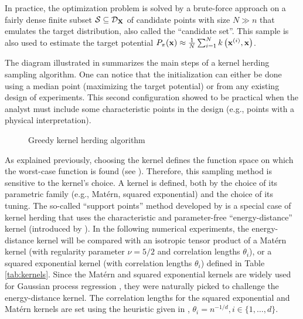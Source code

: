\begin{remark}
In practice, the optimization problem is solved by a brute-force approach on a fairly dense finite subset $\mathcal{S}\subseteq\mathcal{D}_{{\bf X}}$ of candidate points with size $N \gg n$ that emulates the target distribution, also called the ``candidate set''. 
This sample is also used to estimate the target potential $P_\pi({\bf x}) \approx \frac1N \sum_{i=1}^N k\left({\bf x}^{(i)}, {\bf x}\right)$.
\end{remark}
\medskip

The diagram illustrated in  summarizes the main steps of a kernel herding sampling algorithm. 
One can notice that the initialization can either be done using a median point (maximizing the target potential) or from any existing design of experiments. 
This second configuration showed to be practical when the analyst must include some characteristic points in the design (e.g., points with a physical interpretation). 

\begin{figure}
    \centering
    
    \caption{Greedy kernel herding algorithm}
    \label{fig:kh_algo}
\end{figure}

As explained previously, choosing the kernel defines the function space on which the worst-case function is found (see ). 
Therefore, this sampling method is sensitive to the kernel's choice. 
A kernel is defined, both by the choice of its parametric family (e.g., Matérn, squared exponential) and the choice of its tuning. 
The so-called ``support points'' method developed by \cite{mak_joseph_2018} is a special case of kernel herding that uses the characteristic and parameter-free ``energy-distance'' kernel (introduced by \cite{szekely_rizzo_2013}). 
In the following numerical experiments, the energy-distance kernel will be compared with an isotropic tensor product of a Matérn kernel (with regularity parameter $\nu = 5/2$ and correlation lengths $\theta_i$), or a squared exponential kernel (with correlation lengths $\theta_i$) defined in Table \ref{tab:kernels}. 
Since the Matérn and squared exponential kernels are widely used for Gaussian process regression \citep{rasmussen_2006}, they were naturally picked to challenge the energy-distance kernel. 
The correlation lengths for the squared exponential and Matérn kernels are set using the heuristic given in \cite{fekhari_iooss_2023}, $\theta_i = n^{-1/d}, i \in \{1, \dots, d\}$. 

